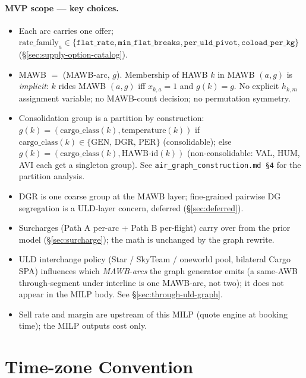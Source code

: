\documentclass[11pt,a4paper]{article}
\theoremstyle{definition}
\begin{document}
\paragraph{MVP scope --- key choices.}
\begin{itemize}[noitemsep]
  \item Each arc carries one offer; $\text{rate\_family}_a \in \{\texttt{flat\_rate},
        \texttt{min\_flat\_breaks}, \texttt{per\_uld\_pivot},
        \texttt{coload\_per\_kg}\}$ (\S\ref{sec:supply-option-catalog}).
  \item MAWB $=$ (MAWB-arc, $g$). Membership of HAWB $k$ in MAWB $(a, g)$ is
        \emph{implicit}: $k$ rides MAWB $(a, g)$ iff $x_{k,a} = 1$ and $g(k) =
        g$. No explicit $h_{k,m}$ assignment variable; no MAWB-count decision;
        no permutation symmetry.
  \item Consolidation group is a partition by construction:
        $g(k) = (\text{cargo\_class}(k), \text{temperature}(k))$ if
        $\text{cargo\_class}(k) \in \{\text{GEN, DGR, PER}\}$ (consolidable);
        else $g(k) = (\text{cargo\_class}(k), \text{HAWB-id}(k))$
        (non-consolidable: VAL, HUM, AVI each get a singleton group). See
        \texttt{air\_graph\_construction.md \S4} for the partition analysis.
  \item DGR is one coarse group at the MAWB layer; fine-grained pairwise DG
        segregation is a ULD-layer concern, deferred (\S\ref{sec:deferred}).
  \item Surcharges (Path A per-arc + Path B per-flight) carry over from the
        prior model (\S\ref{sec:surcharge}); the math is unchanged by the graph
        rewrite.
  \item ULD interchange policy (Star / SkyTeam / oneworld pool, bilateral
        Cargo SPA) influences which \emph{MAWB-arcs} the graph generator emits
        (a same-AWB through-segment under interline is one MAWB-arc, not two);
        it does not appear in the MILP body. See
        \S\ref{sec:through-uld-graph}.
  \item Sell rate and margin are upstream of this MILP (quote engine at booking
        time); the MILP outputs cost only.
\end{itemize}

\section{Time-zone Convention}
\label{sec:tz-convention}
\end{document}
